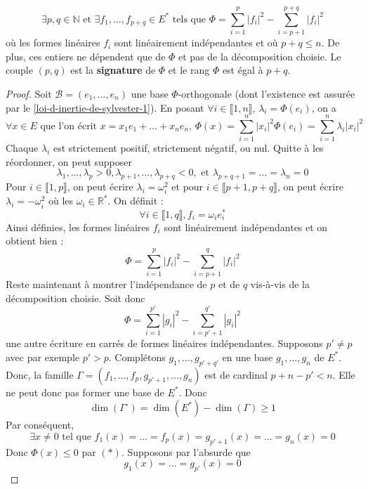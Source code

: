  \begin{theorem}
    \[ \exists p, q \in \mathbb{N} \text{ et } \exists f_1, \dots, f_{p+q} \in E^* \text{ tels que } \Phi = \sum_{i=1}^p |f_i|^2 - \sum_{i=p+1}^{p+q} |f_i|^2 \]
    où les formes linéaires $f_i$ sont linéairement indépendantes et où $p + q \leq n$. De plus, ces entiers ne dépendent que de $\Phi$ et pas de la décomposition choisie.
    \newpar
    Le couple $(p,q)$ est la \textbf{signature} de $\Phi$ et le rang $\Phi$ est égal à $p+q$.
  \end{theorem}

  \begin{proof}
    Soit $\mathcal{B} = (e_1, \dots, e_n)$ une base $\Phi$-orthogonale (dont l'existence est assurée par le \cref{loi-d-inertie-de-sylvester-1}). En posant $\forall i \in \llbracket 1, n \rrbracket$, $\lambda_i = \Phi(e_i)$, on a
    \[ \forall x \in E \text{ que l'on écrit } x = x_1 e_1 + \dots + x_n e_n, \, \Phi(x) = \sum_{i=1}^n |x_i|^2 \Phi(e_i) = \sum_{i=1}^n \lambda_i |x_i|^2 \]
    Chaque $\lambda_i$ est strictement positif, strictement négatif, ou nul. Quitte à les réordonner, on peut supposer
    \[ \lambda_1, \dots, \lambda_p > 0, \lambda_{p+1}, \dots, \lambda_{p+q} < 0, \text{ et } \lambda_{p+q+1} = \dots = \lambda_n = 0 \]
    Pour $i \in \llbracket 1, p \rrbracket$, on peut écrire $\lambda_i = \omega_i^2$ et pour $i \in \llbracket p+1, p+q \rrbracket$, on peut écrire $\lambda_i = -\omega_i^2$ où les $\omega_i \in \mathbb{R}^*$. On définit :
    \[ \forall i \in \llbracket 1, q \rrbracket, f_i = \omega_i e_i^* \]
    Ainsi définies, les formes linéaires $f_i$ sont linéairement indépendantes et on obtient bien :
    \[ \Phi = \sum_{i=1}^p |f_i|^2 - \sum_{i=p+1}^q |f_i|^2 \tag{$*$} \]
    Reste maintenant à montrer l'indépendance de $p$ et de $q$ vis-à-vis de la décomposition choisie. Soit donc
    \[ \Phi = \sum_{i=1}^{p'} |g_i|^2 - \sum_{i=p'+1}^{q'} |g_i|^2 \tag{$**$} \]
    une autre écriture en carrés de formes linéaires indépendantes. Supposons $p' \neq p$ avec par exemple $p' > p$. Complétons $g_1, \dots, g_{p'+q'}$ en une base $g_1, \dots, g_n$ de $E^*$. Donc, la famille $\Gamma = (f_1, \dots, f_p, g_{p'+1}, \dots, g_n)$ est de cardinal $p + n - p' < n$. Elle ne peut donc pas former une base de $E^*$. Donc
    \[ \dim(\Gamma^\circ) = \dim(E^*) - \dim(\Gamma) \geq 1 \]
    Par conséquent,
    \[ \exists x \neq 0 \text{ tel que } f_1(x) = \dots = f_p(x) = g_{p'+1}(x) = \dots = g_n(x) = 0 \]
    Donc $\Phi(x) \leq 0$ par $(*)$. Supposons par l'absurde que
    \[ g_1(x) = \dots = g_{p'}(x) = 0 \]

\end{proof}
